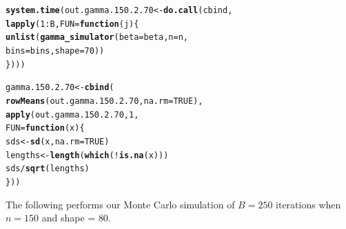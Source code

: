 \documentclass[11pt]{article}\usepackage[]{graphicx}\usepackage[]{color}
\makeatletter
\newcommand{\hlnum}[1]{\textcolor[rgb]{0.686,0.059,0.569}{#1}}%
\newcommand{\hlopt}[1]{\textcolor[rgb]{0,0,0}{#1}}%
\newcommand{\hlstd}[1]{\textcolor[rgb]{0.345,0.345,0.345}{#1}}%
\newcommand{\hlkwa}[1]{\textcolor[rgb]{0.161,0.373,0.58}{\textbf{#1}}}%
\newcommand{\hlkwb}[1]{\textcolor[rgb]{0.69,0.353,0.396}{#1}}%
\newcommand{\hlkwc}[1]{\textcolor[rgb]{0.333,0.667,0.333}{#1}}%
\newcommand{\hlkwd}[1]{\textcolor[rgb]{0.737,0.353,0.396}{\textbf{#1}}}%
\newenvironment{kframe}{%
 \def\at@end@of@kframe{}%
 \ifinner\ifhmode%
  \def\at@end@of@kframe{\end{minipage}}%
  \begin{minipage}{\columnwidth}%
 \fi\fi%
 \def\FrameCommand##1{\hskip\@totalleftmargin \hskip-\fboxsep
 \colorbox{shadecolor}{##1}\hskip-\fboxsep
     \hskip-\linewidth \hskip-\@totalleftmargin \hskip\columnwidth}%
 \MakeFramed {\advance\hsize-\width
   \@totalleftmargin\z@ \linewidth\hsize
   \@setminipage}}%
 {\par\unskip\endMakeFramed%
 \at@end@of@kframe}
\newenvironment{knitrout}{}{} %
\makeatother
\begin{document}
\begin{knitrout}
\color{fgcolor}\begin{kframe}
\begin{alltt}
\hlkwd{system.time}\hlstd{(out.gamma.150.2.70} \hlkwb{<-} \hlkwd{do.call}\hlstd{(cbind,}
  \hlkwd{lapply}\hlstd{(}\hlnum{1}\hlopt{:}\hlstd{B,} \hlkwc{FUN} \hlstd{=} \hlkwa{function}\hlstd{(}\hlkwc{j}\hlstd{)\{}
    \hlkwd{unlist}\hlstd{(}\hlkwd{gamma_simulator}\hlstd{(}\hlkwc{beta} \hlstd{= beta,} \hlkwc{n} \hlstd{= n,}
      \hlkwc{bins} \hlstd{= bins,} \hlkwc{shape} \hlstd{=} \hlnum{70}\hlstd{))}
\hlstd{\})))}
\end{alltt}


{\ttfamily\noindent\bfseries\color{errorcolor}{\#\# Error in eval(family\$initialize): non-positive values not allowed for the 'gamma' family}}

{\ttfamily\noindent\itshape\color{messagecolor}{\#\# Timing stopped at: 0.002 0 0.003}}\end{kframe}
\end{knitrout}

\begin{knitrout}
\color{fgcolor}\begin{kframe}
\begin{alltt}
\hlstd{gamma.150.2.70} \hlkwb{<-} \hlkwd{cbind}\hlstd{(}
  \hlkwd{rowMeans}\hlstd{(out.gamma.150.2.70,} \hlkwc{na.rm} \hlstd{=} \hlnum{TRUE}\hlstd{),}
  \hlkwd{apply}\hlstd{(out.gamma.150.2.70,} \hlnum{1}\hlstd{,}
  \hlkwc{FUN} \hlstd{=} \hlkwa{function}\hlstd{(}\hlkwc{x}\hlstd{)\{}
    \hlstd{sds} \hlkwb{<-} \hlkwd{sd}\hlstd{(x,} \hlkwc{na.rm} \hlstd{=} \hlnum{TRUE}\hlstd{)}
    \hlstd{lengths} \hlkwb{<-} \hlkwd{length}\hlstd{(}\hlkwd{which}\hlstd{(}\hlopt{!}\hlkwd{is.na}\hlstd{(x)))}
    \hlstd{sds} \hlopt{/} \hlkwd{sqrt}\hlstd{(lengths)}
  \hlstd{\}))}
\end{alltt}


{\ttfamily\noindent\bfseries\color{errorcolor}{\#\# Error in is.data.frame(x): object 'out.gamma.150.2.70' not found}}\end{kframe}
\end{knitrout}

The following performs our Monte Carlo simulation of $B = 250$ iterations 
when $n = 150$ and shape = $80$.
\end{document}
